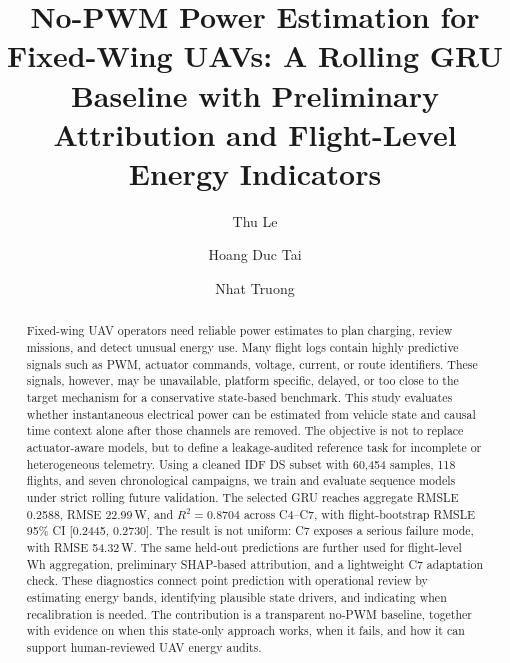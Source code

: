 \documentclass[runningheads,a4paper]{llncs}
\begin{document}
\title{No-PWM Power Estimation for Fixed-Wing UAVs: A Rolling GRU Baseline with Preliminary Attribution and Flight-Level Energy Indicators}


\author{Thu Le \and Hoang Duc Tai \and Nhat Truong}



\maketitle

\begin{abstract}
Fixed-wing UAV operators need reliable power estimates to plan charging, review missions, and detect unusual energy use. Many flight logs contain highly predictive signals such as PWM, actuator commands, voltage, current, or route identifiers. These signals, however, may be unavailable, platform specific, delayed, or too close to the target mechanism for a conservative state-based benchmark. This study evaluates whether instantaneous electrical power can be estimated from vehicle state and causal time context alone after those channels are removed. The objective is not to replace actuator-aware models, but to define a leakage-audited reference task for incomplete or heterogeneous telemetry. Using a cleaned IDF DS subset with 60,454 samples, 118 flights, and seven chronological campaigns, we train and evaluate sequence models under strict rolling future validation. The selected GRU reaches aggregate RMSLE 0.2588, RMSE 22.99\,W, and $R^2 = 0.8704$ across C4--C7, with flight-bootstrap RMSLE 95\% CI [0.2445, 0.2730]. The result is not uniform: C7 exposes a serious failure mode, with RMSE 54.32\,W. The same held-out predictions are further used for flight-level Wh aggregation, preliminary SHAP-based attribution, and a lightweight C7 adaptation check. These diagnostics connect point prediction with operational review by estimating energy bands, identifying plausible state drivers, and indicating when recalibration is needed. The contribution is a transparent no-PWM baseline, together with evidence on when this state-only approach works, when it fails, and how it can support human-reviewed UAV energy audits.

\end{abstract}
\end{document}
